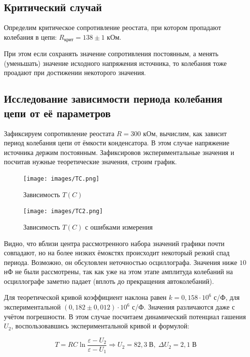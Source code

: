 \documentclass[a4paper, 12pt]{article}%
\begin{document}
\subsection{Критический случай}

Определим критическое сопротивление реостата, при котором пропадают колебания в цепи: $R_{\text{крит}} = 138 \pm 1$ кОм.

При этом если сохранять значение сопротивления постоянным, а менять (уменьшать) значение исходного напряжения источника, то колебания тоже проадают при достижении некоторого значения.

\subsection{Исследование зависимости периода колебания цепи от её параметров}

Зафиксируем сопротивление реостата $R = 300$ кОм, вычислим, как зависит период колебания цепи от ёмкости конденсатора. В этом случае напряжение источника держим постоянным.
Зафиксировов экспериментальные значения и посчитав нужные теоретические значения, строим график.

\begin{figure}[h]
    \centering
    \texttt{[image: images/TC.png]}
    \caption{Зависимость $T(C)$}
    \label{TC}
\end{figure}

\begin{figure}[h]
    \centering
    \texttt{[image: images/TC2.png]}
    \caption{Зависимость $T(C)$ с ошибками измерения}
    \label{TC2}
\end{figure}

Видно, что вблизи центра рассмотренного набора значений графики почти совпадают, но на более низких ёмокстях происходит некоторый резкий спад периода. Возможно, он обсуловлен неточностью осциллографа. Значения ниже $10$ нФ не были рассмотрены, так как уже на этом этапе амплитуда колебаний на осциллографе заметно падает (вплоть до прекращения автоколебаний).

Для теоретической кривой коэффициент наклона равен $k = 0,158 \cdot 10^6$ с/Ф, для экспериментальной $(0,182 \pm 0,012) \cdot 10^6$ с/Ф. Значения различаются даже с учётом погрешности. В этом случае посчитаем динамический потенциал гашения $U_2$, воспользовавшись экспериментальной кривой и формулой:

\begin{equation}
    T = RC \ln{\frac{\varepsilon - U_2}{\varepsilon - U_1}} \Rightarrow U_2 = 82,3 \; \text{В}, \; \Delta U_2 = 2,1 \; \text{В}
\end{equation}
\end{document}
